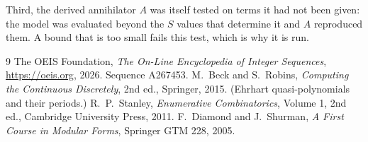 \documentclass[11pt,a4paper]{article}
\theoremstyle{plain}
\theoremstyle{definition}
\begin{document}
Third, the derived annihilator $A$ was itself tested on terms it had not been given: the model
was evaluated beyond the $S$ values that determine it and $A$ reproduced them. A bound that is
too small fails this test, which is why it is run.

\begin{thebibliography}{9}
 The OEIS Foundation, \emph{The On-Line Encyclopedia of Integer
Sequences}, \url{https://oeis.org}, 2026. Sequence A267453.
 M.~Beck and S.~Robins, \emph{Computing the Continuous Discretely},
2nd ed., Springer, 2015. (Ehrhart quasi-polynomials and their periods.)
 R.~P.~Stanley, \emph{Enumerative Combinatorics}, Volume 1, 2nd ed.,
Cambridge University Press, 2011.
 F.~Diamond and J.~Shurman, \emph{A First Course in Modular Forms},
Springer GTM 228, 2005.
\end{thebibliography}
\end{document}
